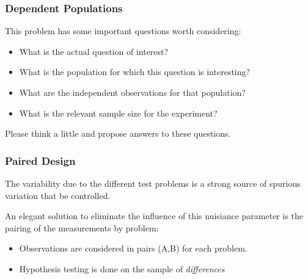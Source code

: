 \documentclass[10pt]{beamer}
\begin{document}
\begin{frame}
  \frametitle{Dependent Populations}
  This problem has some important questions worth considering:
  \bigskip

  \begin{itemize}
  \item What is the actual question of interest?
  \item What is the population for which this question is interesting?
  \item What are the independent observations for that population?
  \item What is the relevant sample size for the experiment?
  \end{itemize}
  
  \bigskip

  Please think a little and propose answers to these questions.
\end{frame}

\begin{frame}
  \frametitle{Paired Design} 

  The variability due to the different test problems is a strong
  source of spurious variation that  be
  controlled.

  \medskip

  An elegant solution to eliminate the influence of this nuisiance
  parameter is the pairing of the measurements by problem:
  
  \medskip

  \begin{itemize}
  \item Observations are considered in pairs (A,B) for each problem.
  \item Hypothesis testing is done on the sample of \emph{differences}
  \end{itemize}
  
\end{frame}
\end{document}
